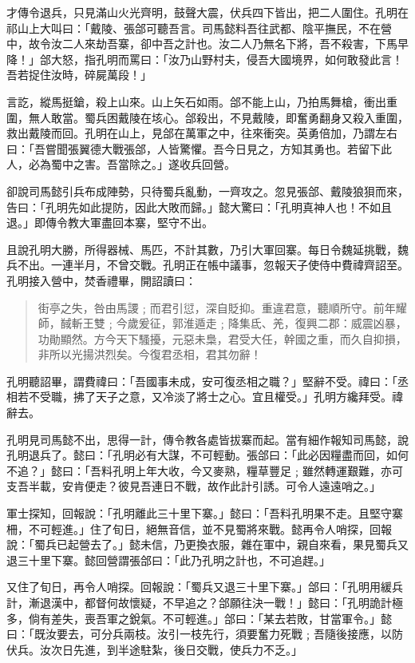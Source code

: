 才傳令退兵，只見滿山火光齊明，鼓聲大震，伏兵四下皆出，把二人圍住。孔明在祁山上大叫曰：「戴陵、張郃可聽吾言。司馬懿料吾往武都、陰平撫民，不在營中，故令汝二人來劫吾寨，卻中吾之計也。汝二人乃無名下將，吾不殺害，下馬早降！」郃大怒，指孔明而罵曰：「汝乃山野村夫，侵吾大國境界，如何敢發此言！吾若捉住汝時，碎屍萬段！」

言訖，縱馬挺鎗，殺上山來。山上矢石如雨。郃不能上山，乃拍馬舞槍，衝出重圍，無人敢當。蜀兵困戴陵在垓心。郃殺出，不見戴陵，即奮勇翻身又殺入重圍，救出戴陵而回。孔明在山上，見郃在萬軍之中，往來衝突。英勇倍加，乃謂左右曰：「吾嘗聞張翼德大戰張郃，人皆驚懼。吾今日見之，方知其勇也。若留下此人，必為蜀中之害。吾當除之。」遂收兵回營。

卻說司馬懿引兵布成陣勢，只待蜀兵亂動，一齊攻之。忽見張郃、戴陵狼狽而來，告曰：「孔明先如此提防，因此大敗而歸。」懿大驚曰：「孔明真神人也！不如且退。」即傳令教大軍盡回本寨，堅守不出。

且說孔明大勝，所得器械、馬匹，不計其數，乃引大軍回寨。每日令魏延挑戰，魏兵不出。一連半月，不曾交戰。孔明正在帳中議事，忽報天子使侍中費禕齊詔至。孔明接入營中，焚香禮畢，開詔讀曰：

\begin{quote}
街亭之失，咎由馬謖﹔而君引愆，深自貶抑。重違君意，聽順所守。前年耀師，馘斬王雙﹔今歲爰征，郭淮遁走﹔降集氐、羌，復興二郡：威震凶暴，功勛顯然。方今天下騷擾，元惡未梟，君受大任，幹國之重，而久自抑損，非所以光揚洪烈矣。今復君丞相，君其勿辭！
\end{quote}

孔明聽詔畢，謂費禕曰：「吾國事未成，安可復丞相之職？」堅辭不受。禕曰：「丞相若不受職，拂了天子之意，又冷淡了將士之心。宜且權受。」孔明方纔拜受。禕辭去。

孔明見司馬懿不出，思得一計，傳令教各處皆拔寨而起。當有細作報知司馬懿，說孔明退兵了。懿曰：「孔明必有大謀，不可輕動。張郃曰：「此必因糧盡而回，如何不追？」懿曰：「吾料孔明上年大收，今又麥熟，糧草豐足﹔雖然轉運艱難，亦可支吾半載，安肯便走？彼見吾連日不戰，故作此計引誘。可令人遠遠哨之。」

軍士探知，回報說：「孔明離此三十里下寨。」懿曰：「吾料孔明果不走。且堅守寨柵，不可輕進。」住了旬日，絕無音信，並不見蜀將來戰。懿再令人哨探，回報說：「蜀兵已起營去了。」懿未信，乃更換衣服，雜在軍中，親自來看，果見蜀兵又退三十里下寨。懿回營謂張郃曰：「此乃孔明之計也，不可追趕。」

又住了旬日，再令人哨探。回報說：「蜀兵又退三十里下寨。」郃曰：「孔明用緩兵計，漸退漢中，都督何故懷疑，不早追之？郃願往決一戰！」懿曰：「孔明詭計極多，倘有差失，喪吾軍之銳氣。不可輕進。」郃曰：「某去若敗，甘當軍令。」懿曰：「既汝要去，可分兵兩枝。汝引一枝先行，須要奮力死戰﹔吾隨後接應，以防伏兵。汝次日先進，到半途駐紮，後日交戰，使兵力不乏。」

